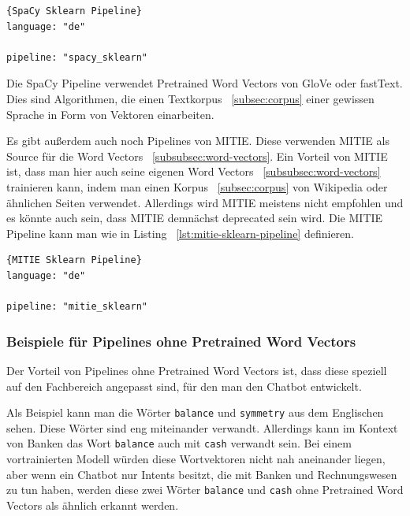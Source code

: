 \begin{lstlisting}[label={lst:spacy-sklearn-pipeline},caption={SpaCy Sklearn Pipeline}]{SpaCy Sklearn Pipeline}
language: "de"

pipeline: "spacy_sklearn"
\end{lstlisting}

Die SpaCy Pipeline verwendet Pretrained Word Vectors von GloVe oder fastText.
Dies sind Algorithmen, die einen Textkorpus ~\ref{subsec:corpus} einer gewissen Sprache in Form von Vektoren einarbeiten.\cite{spacySklearnPipeline, spacyNLP, rasaMasterclassPreConfiguredPipelines}

Es gibt außerdem auch noch Pipelines von MITIE.
Diese verwenden MITIE als Source für die Word Vectors ~\ref{subsubsec:word-vectors}.
Ein Vorteil von MITIE ist, dass man hier auch seine eigenen Word Vectors ~\ref{subsubsec:word-vectors} trainieren kann, indem man einen Korpus ~\ref{subsec:corpus} von Wikipedia oder ähnlichen Seiten verwendet.
Allerdings wird MITIE meistens nicht empfohlen und es könnte auch sein, dass MITIE demnächst deprecated sein wird.
Die MITIE Pipeline kann man wie in Listing ~\ref{lst:mitie-sklearn-pipeline} definieren.\cite{mitieNLP, mitieDeprecated}

\begin{lstlisting}[label={lst:mitie-sklearn-pipeline},caption={MITIE Sklearn Pipeline}]{MITIE Sklearn Pipeline}
language: "de"

pipeline: "mitie_sklearn"
\end{lstlisting}

\subsubsection{Beispiele für Pipelines ohne Pretrained Word Vectors}\label{subsubsec:pipeline-without-pretrained-word-vectors}

Der Vorteil von Pipelines ohne Pretrained Word Vectors ist, dass diese speziell auf den Fachbereich angepasst sind, für den man den Chatbot entwickelt.\cite{pretrainedVsSupervised, tensorFlowEmbedding}

Als Beispiel kann man die Wörter \texttt{balance} und \texttt{symmetry} aus dem Englischen sehen.
Diese Wörter sind eng miteinander verwandt.
Allerdings kann im Kontext von Banken das Wort \texttt{balance} auch mit \texttt{cash} verwandt sein.
Bei einem vortrainierten Modell würden diese Wortvektoren nicht nah aneinander liegen, aber wenn ein Chatbot nur Intents besitzt, die mit Banken und Rechnungswesen zu tun haben, werden diese zwei Wörter \texttt{balance} und \texttt{cash} ohne Pretrained Word Vectors als ähnlich erkannt werden.\cite{tensorFlowEmbedding}

